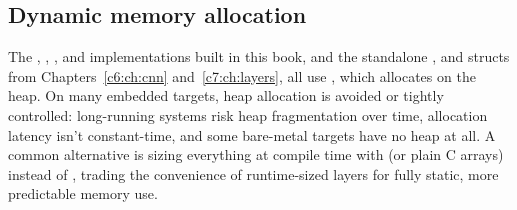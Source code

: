 \subsection{Dynamic memory allocation}
\label{c10:sec:heap}
The , , , and  implementations built in this
book, and the standalone ,  and 
structs from Chapters~\ref{c6:ch:cnn} and~\ref{c7:ch:layers}, all use , which
allocates on the heap. On many embedded targets, heap allocation is avoided or tightly controlled:
long-running systems risk heap fragmentation over time, allocation latency isn't constant-time, and
some bare-metal targets have no heap at all. A common alternative is sizing everything at compile
time with  (or plain C arrays) instead of , trading the
convenience of runtime-sized layers for fully static, more predictable memory use.
